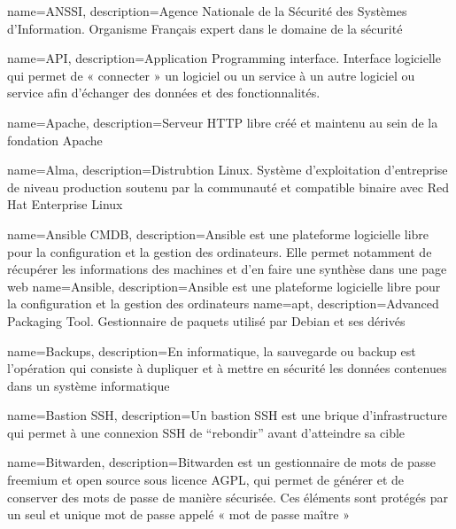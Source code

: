 {
    name=ANSSI,
    description={Agence Nationale de la Sécurité des Systèmes d'Information. Organisme Français expert dans le domaine de la sécurité}
}

{
    name=API,
    description={Application Programming interface. Interface logicielle qui permet de « connecter » un logiciel ou un service à un autre logiciel ou service afin d'échanger des données et des fonctionnalités.}
}

{
    name=Apache,
    description={Serveur HTTP libre créé et maintenu au sein de la fondation Apache}
}

{
    name=Alma,
    description={Distrubtion Linux. Système d'exploitation d'entreprise de niveau production soutenu par la communauté et compatible binaire avec Red Hat Enterprise Linux}
}

{
    name=Ansible CMDB,
    description={Ansible est une plateforme logicielle libre pour la configuration et la gestion des ordinateurs. Elle permet notamment de récupérer les informations des machines et d'en faire une synthèse dans une page web}
}
{
    name=Ansible,
    description={Ansible est une plateforme logicielle libre pour la configuration et la gestion des ordinateurs}
}
{
    name=apt,
    description={Advanced Packaging Tool. Gestionnaire de paquets utilisé par Debian et ses dérivés}
}


{
    name=Backups,
    description={En informatique, la sauvegarde ou backup est l'opération qui consiste à dupliquer et à mettre en sécurité les données contenues dans un système informatique}
}

{
    name=Bastion SSH,
    description={Un bastion SSH est une brique d'infrastructure qui permet à une connexion SSH de “rebondir” avant d'atteindre sa cible}
}

{
    name=Bitwarden,
    description={Bitwarden est un gestionnaire de mots de passe freemium et open source sous licence AGPL, qui permet de générer et de conserver des mots de passe de manière sécurisée. Ces éléments sont protégés par un seul et unique mot de passe appelé « mot de passe maître »}
}

